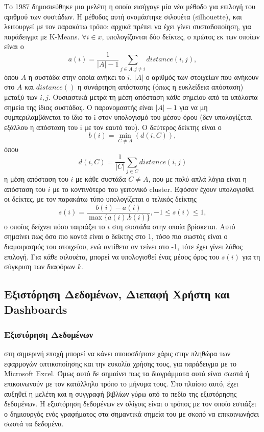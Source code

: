 \documentclass{article}
\begin{document}
Το 1987 δημοσιεύθηκε μια μελέτη η οποία εισήγαγε μία νέα μέθοδο για επιλογή του αριθμού των συστάδων. \cite{rousseeuw1987silhouettes} Η μέθοδος αυτή ονομάστηκε σιλουέτα (silhouette), και λειτουργεί με τον παρακάτω τρόπο: αρχικά πρέπει να έχει γίνει συσταδοποίηση, για παράδειγμα με K-Means. $\forall i \in x$, υπολογίζονται δύο δείκτες, ο πρώτος εκ των οποίων είναι ο \[ a(i)=\frac{1}{|A|-1}  \sum_{j \in A,j \neq i}distance(i,j),\] όπου $A$ η συστάδα στην οποία ανήκει το $i$, $|Α|$ ο αριθμός των στοιχείων που ανήκουν στο $A$ και $distance()$ η συνάρτηση απόστασης (όπως η ευκλείδεια απόσταση) μεταξύ των $i,j$. Ουσιαστικά μετρά τη μέση απόσταση κάθε σημείου από τα υπόλοιπα σημεία της ίδιας συστάδας. Ο παρονομαστής είναι $|A|-1$ για να μη συμπεριλαμβάνεται το ίδιο το i στον υπολογισμό του μέσου όρου (δεν υπολογίζεται εξάλλου η απόσταση του i με τον εαυτό του). Ο δεύτερος δείκτης είναι ο \[ b(i)=\min_{C \neq A}(d(i,C)),\] όπου \[ d(i,C)=\frac{1}{|C|} \sum_{j \in C} distance(i,j)\] η μέση απόσταση του $i$ με κάθε συστάδα $C \neq A$, που με πολύ απλά λόγια είναι η απόσταση του $i$ με το κοντινότερο του γειτονικό cluster.
Εφόσον έχουν υπολογισθεί οι δείκτες, με τον παρακάτω τύπο υπολογίζεται ο τελικός δείκτης \[ s(i)=\frac{b(i)-a(i)}{\max{\{a(i).b(i)\}}},-1 \leq s(i) \leq 1,\] ο οποίος δείχνει πόσο ταιριάζει το $i$ στη συστάδα στην οποία βρίσκεται. Αυτό σημαίνει πως όσο πιο κοντά είναι ο δείκτης στο 1, τόσο πιο σωστός είναι ο διαμοιρασμός του στοιχείου, ενώ αντίθετα αν τείνει στο -1, τότε έχει γίνει λάθος επιλογή. Για κάθε σιλουέτα, μπορεί να υπολογισθεί ένας μέσος όρος του $s(i)$ για τη σύγκριση των διαφόρων $k$.

\subsection{Εξιστόρηση Δεδομένων, Διεπαφή Χρήστη και Dashboards}

\subsubsection{Εξιστόρηση Δεδομένων}

 στη σημερινή εποχή μπορεί να κάνει οποιοσδήποτε χάρις στην πληθώρα των εφαρμογών οπτικοποίησης και την ευκολία χρήσης τους, για παράδειγμα με το Microsoft Excel. Όμως αυτό δε σημαίνει πως τα διαγράμματα αυτά είναι σωστά ή επικοινωνούν με τον κατάλληλο τρόπο το μήνυμα τους. Στο πλαίσιο αυτό, έχει αυξηθεί η μελέτη και η συγγραφή βιβλίων γύρω από το πεδίο της εξιστόρησης δεδομένων. Η εξιστόρηση δεδομένων εν ολίγοις είναι ο τρόπος με τον οποίο εστιάζει ο δημιουργός ενός γραφήματος στα σημαντικά σημεία του με σκοπό να επικοινωνήσει σωστά τα δεδομένα. \cite{echeverria2018driving}
\end{document}
